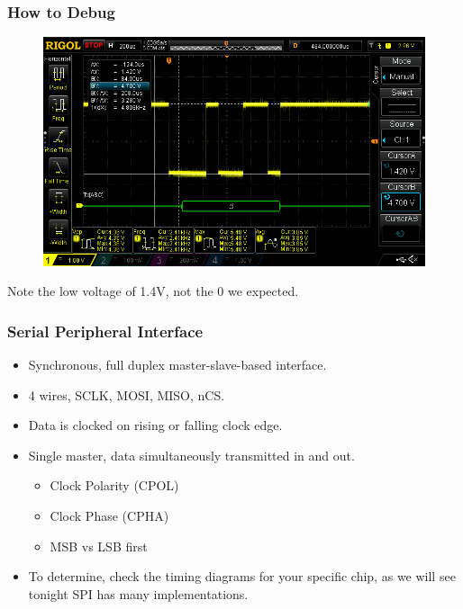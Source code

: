 \documentclass[t]{beamer}
\begin{document}

\begin{frame}[t]
\frametitle{How to Debug}
\begin{figure}
\includegraphics[width=0.9\linewidth]{badSerial.png}
\end{figure}
Note the low voltage of 1.4V, not the 0 we expected. 
\end{frame}


\begin{frame}[t]
\frametitle{Serial Peripheral Interface}
\begin{itemize}
	\item Synchronous, full duplex master-slave-based interface.
	\item 4 wires, SCLK, MOSI, MISO, nCS.
	\item Data is clocked on rising or falling clock edge.
	\item Single master, data simultaneously transmitted in and out.
	\begin{itemize}
		\item Clock Polarity (CPOL)
		\item Clock Phase (CPHA)
		\item MSB vs LSB first
	\end{itemize}
	\item To determine, check the timing diagrams for your specific chip, as we will see tonight SPI has many implementations.
\end{itemize}

\end{frame}

\end{document}
